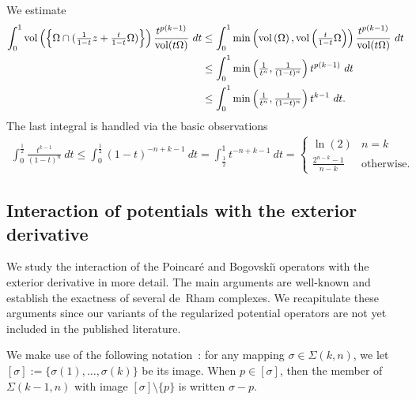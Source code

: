 \documentclass[10pt,a4paper]{article}
\begin{document}
\color{blue}
We estimate 
\begin{align*}
    \int_{0}^{1}
    \operatorname{vol}\left(\left\{ 
        \Omega \cap ( \tfrac{1}{1-t} z + \tfrac{t}{1-t} \Omega )
    \right\}\right)
    \frac{ t^{p(k-1)} }{ \operatorname{vol}(t\Omega) }
    \ dt
    &
    \leq 
    \int_{0}^{1}
    \min\left( 
        \operatorname{vol}\left(\Omega\right), 
        \operatorname{vol}\left( \tfrac{t}{1-t} \Omega \right) 
    \right)
    \frac{ t^{p(k-1)} }{ \operatorname{vol}(t\Omega) }
    \ dt
    \\&
    \leq 
    \int_{0}^{1}
    \min\left( \tfrac{1}{t^{n}}, \tfrac{1}{(1-t)^n} \right) 
    t^{p(k-1)} 
    \ dt
    \\&
    \leq 
    \int_{0}^{1}
    \min\left( \tfrac{1}{t^{n}}, \tfrac{1}{(1-t)^n} \right) 
    t^{k-1} 
    \ dt
    .
\end{align*}
The last integral is handled via the basic observations
\begin{align*}
    \int_{0}^{\frac 1 2} 
    \frac{ t^{k-1} }{ (1-t)^{n} }
    \ dt
    \leq 
    \int_{0}^{\frac 1 2} 
    (1-t)^{-n+k-1}
    \ dt
    =
    \int_{\frac 1 2}^{1} 
    t^{-n+k-1}
    \ dt
    =
    \begin{cases}
        \ln(2)                 & \text{$n=k$}
        \\
        \frac{2^{n-k}-1}{n-k} & \text{otherwise.}
    \end{cases}
\end{align*}





\subsection{Interaction of potentials with the exterior derivative}
\color{black}
We study the interaction of the Poincar\'e and Bogovski\u{\i} operators with the exterior derivative in more detail.
% 
The main arguments are well-known and establish the exactness of several de~Rham complexes. 
We recapitulate these arguments since our variants of the regularized potential operators are not yet included in the published literature. 

We make use of the following notation~\cite{licht2022basis}:
for any mapping $\sigma \in \Sigma(k,n)$, we let $[\sigma] := \{ \sigma(1), \dots, \sigma(k) \}$ be its image. 
When $p \in [\sigma]$, then the member of $\Sigma(k-1,n)$ with image $[\sigma] \setminus \{p\}$ is written $\sigma-p$.
\end{document}
